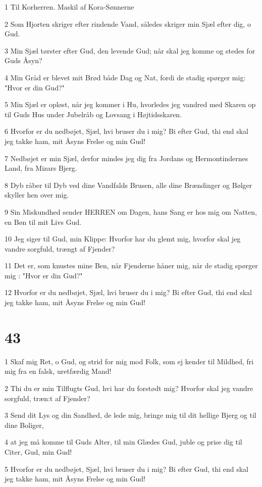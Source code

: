 \par 1 Til Korherren. Maskil af Kora-Sønnerne
\par 2 Som Hjorten skriger efter rindende Vand, således skriger min Sjæl efter dig, o Gud.
\par 3 Min Sjæl tørster efter Gud, den levende Gud; når skal jeg komme og stedes for Guds Åsyn?
\par 4 Min Gråd er blevet mit Brød både Dag og Nat, fordi de stadig spørger mig: "Hvor er din Gud?"
\par 5 Min Sjæl er opløst, når jeg kommer i Hu, hvorledes jeg vandred med Skaren op til Guds Hus under Jubelråb og Lovsang i Højtidsskaren.
\par 6 Hvorfor er du nedbøjet, Sjæl, hvi bruser du i mig? Bi efter Gud, thi end skal jeg takke ham, mit Åsyns Frelse og min Gud!
\par 7 Nedbøjet er min Sjæl, derfor mindes jeg dig fra Jordans og Hermontindernes Land, fra Mizars Bjerg.
\par 8 Dyb råber til Dyb ved dine Vandfalds Brusen, alle dine Brændinger og Bølger skyller hen over mig.
\par 9 Sin Miskundhed sender HERREN om Dagen, hans Sang er hos mig om Natten, en Bøn til mit Livs Gud.
\par 10 Jeg siger til Gud, min Klippe: Hvorfor har du glemt mig, hvorfor skal jeg vandre sorgfuld, trængt af Fjender?
\par 11 Det er, som knustes mine Ben, når Fjenderne håner mig, når de stadig spørger mig : "Hvor er din Gud?"
\par 12 Hvorfor er du nedbøjet, Sjæl, hvi bruser du i mig? Bi efter Gud, thi end skal jeg takke ham, mit Åsyns Frelse og min Gud!

\chapter{43}

\par 1 Skaf mig Ret, o Gud, og strid for mig mod Folk, som ej kender til Mildhed, fri mig fra en falsk, uretfærdig Mand!
\par 2 Thi du er min Tilflugts Gud, hvi har du forstødt mig? Hvorfor skal jeg vandre sorgfuld, træn:t af Fjender?
\par 3 Send dit Lys og din Sandhed, de lede mig, bringe mig til dit hellige Bjerg og til dine Boliger,
\par 4 at jeg må komme til Guds Alter, til min Glædes Gud, juble og prise dig til Citer, Gud, min Gud!
\par 5 Hvorfor er du nedbøjet, Sjæl, hvi bruser du i mig? Bi efter Gud, thi end skal jeg takke ham, mit Åsyns Frelse og min Gud!

